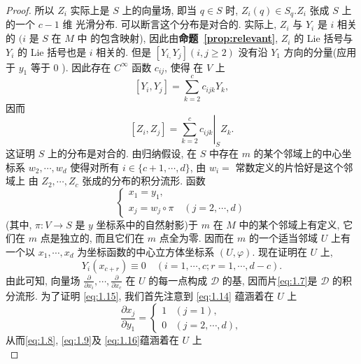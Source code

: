 \begin{proof}
所以 $Z_i$ 实际上是 $S$ 上的向量场, 即当 $q \in S$ 时, $Z_i(q) \in S_q . Z_i$ 张成 $S$ 上的一个 $c-1$ 维 光滑分布. 可以断言这个分布是对合的. 实际上, $Z_i$ 与 $Y_i$ 是 $i$ 相关的 $(i$ 是 $S$ 在 $M$ 中 的包含映射), 因此由\textbf{命题~\ref{prop:relevant}}, $Z_i$ 的 Lie 括号与 $Y_i$ 的 Lie 括号也是 $i$ 相关的. 但是 $\left[Y_{i,} Y_j\right](i, j \geqslant 2)$ 没有沿 $Y_1$ 方向的分量(应用于 $y_1$ 等于 0 ). 因此存在 $C^{\infty}$ 函数 $c_{i j}$, 使得 在 $V$ 上
\begin{equation}
    \label{eq:1.12}
    \left[Y_i, Y_j\right]=\sum_{k=2}^c c_{i j k} Y_k,
\end{equation}
因而
\begin{equation}
    \label{eq:1.13}
    \left[Z_i, Z_j\right]=\left.\sum_{k=2}^c c_{i j k}\right|_S Z_k .
\end{equation}
这证明 $S$ 上的分布是对合的. 由归纳假设, 在 $S$ 中存在 $m$ 的某个邻域上的中心坐 标系 $w_2, \cdots, w_d$ 使得对所有 $i \in\{c+1, \cdots, d\}$, 由 $w_i=$ 常数定义的片恰好是这个邻域上 由 $Z_2, \cdots, Z_c$ 张成的分布的积分流形.
函数
\begin{equation}
    \label{eq:1.14}
    \left\{\begin{array}{l}
x_1=y_1, \\
x_j=w_j \circ \pi \quad(j=2, \cdots, d)
\end{array}\right.
\end{equation}
(其中, $\pi: V \rightarrow S$ 是 $y$ 坐标系中的自然射影)于 $m$ 在 $M$ 中的某个邻域上有定义, 它
们在 $m$ 点是独立的, 而且它们在 $m$ 点全为零. 因而在 $m$ 的一个适当邻域 $U$ 上有 一个以 $x_1, \cdots, x_d$ 为坐标函数的中心立方体坐标系 $(U, \varphi)$. 现在证明在 $U$ 上,
\begin{equation}
    \label{eq:1.15}
    Y_i\left(x_{c+r}\right) \equiv 0 \quad(i=1, \cdots, c ; r=1, \cdots, d-c) .
\end{equation}
由此可知, 向量场 $\frac{\partial}{\partial x_i}, \cdots, \frac{\partial}{\partial x_c}$ 在 $U$ 的每一点构成 $\mathscr{D}$ 的基, 因而片\eqref{eq:1.7}是 $\mathscr{D}$ 的积分流形.
为了证明 \eqref{eq:1.15}, 我们首先注意到 \eqref{eq:1.14} 蕴涵着在 $U$ 上
\begin{equation}
    \label{eq:1.16}
    \frac{\partial x_j}{\partial y_1}= \begin{cases}1 & (j=1), \\ 0 & (j=2, \cdots, d),\end{cases}
\end{equation}
从而\eqref{eq:1.8}, \eqref{eq:1.9}及 \eqref{eq:1.16}蕴涵着在 $U$ 上
\begin{equation}

\end{equation}
\end{proof}
